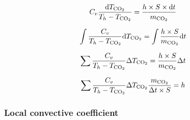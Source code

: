 \begin{equation}
     C_v \frac{\mathrm{d} T_{\ce{CO2}}}{T_h - T_{\ce{CO2}}} = \frac{h \times S \times \mathrm{d}t }{m_{\ce{CO2}}}
\end{equation}

\begin{equation}
    \int  \frac{C_v}{T_h - T_{\ce{CO2}}} \mathrm{d} T_{\ce{CO2}} = \int \frac{h \times S }{m_{\ce{CO2}}} \mathrm{d}t
\end{equation}

\begin{equation}
    \sum  \frac{C_v}{T_h - T_{\ce{CO2}}} \Delta T_{\ce{CO2}} =  \frac{h \times S }{m_{\ce{CO2}}} \Delta t
\end{equation}

\begin{equation}
    \sum  \frac{C_v}{T_h - T_{\ce{CO2}}} \Delta T_{\ce{CO2}} \frac{ m_{\ce{CO2}} }{\Delta t \times S}  =  h
\end{equation}


\subsubsection{Local convective coefficient}